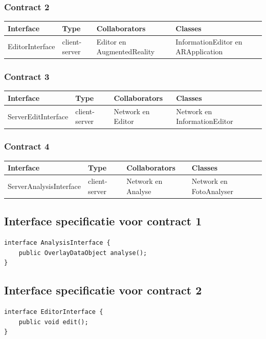 \documentclass[12pt,a4paper,oneside]{article}
\begin{document}
\subsubsection*{Contract 2}
\begin{longtable}{|l|l|p{5cm}|p{5cm}|}
\hline\rowcolor{Gray}
\textbf{Interface} & \textbf{Type}& \textbf{Collaborators} & \textbf{Classes}\\ 
\hline
EditorInterface&client-server&Editor en AugmentedReality & InformationEditor en ARApplication \\
\hline
\end{longtable}
\subsubsection*{Contract 3}
\begin{longtable}{|l|l|p{4cm}|p{5.4cm}|}
\hline\rowcolor{Gray}
\textbf{Interface} & \textbf{Type}& \textbf{Collaborators} & \textbf{Classes}\\ 
\hline
ServerEditInterface&client-server&Network en Editor & Network en InformationEditor\\
\hline
\end{longtable}
\subsubsection*{Contract 4}
\begin{longtable}{|l|l|p{4cm}|p{4.7cm}|}
\hline\rowcolor{Gray}
\textbf{Interface} & \textbf{Type}& \textbf{Collaborators} & \textbf{Classes}\\ 
\hline
ServerAnalysisInterface&client-server&Network en Analyse & Network en FotoAnalyser  \\
\hline
\end{longtable}
\subsection*{Interface specificatie voor contract 1}
\begin{lstlisting}
interface AnalysisInterface {
	public OverlayDataObject analyse();
}
\end{lstlisting}
\subsection*{Interface specificatie voor contract 2}
\begin{lstlisting}
interface EditorInterface {
	public void edit();
}
\end{lstlisting}
\end{document}
